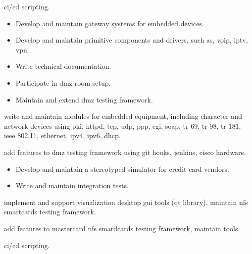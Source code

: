 \documentclass[10pt,a4paper,ragged2e,withhyper]{altacv}
\begin{document}
 ci/cd scripting.

\divider

\begin{itemize}
\item Develop and maintain gateway systems for embedded devices.
\item Develop and maintain primitive components and drivers, such as, voip, iptv, vpn.
\item Write technical documentation.
\item Participate in dmz room setup.
\item Maintain and extend dmz testing framework.
\end{itemize}


 write and maintain modules for embedded equipment, including character
and network devices using pki, httpd, tcp, udp, ppp, cgi, soap, tr-69, tr-98,
tr-181, ieee 802.11, ethernet, ipv4, ipv6, dhcp.

 add features to dmz testing framework using git hooks, jenkins,
cisco hardware.

\divider

\begin{itemize}
\item Develop and maintain a stereotyped simulator for credit card vendors.
\item Write and maintain integration tests.
\end{itemize}


 implement and support visualization desktop gui tools (qt library),
maintain nfs smartcards testing framework.

 add features to mastercard nfs smardcards testing
framework, maintain tools.

 ci/cd scripting.

\divider

\divider


\end{document}
